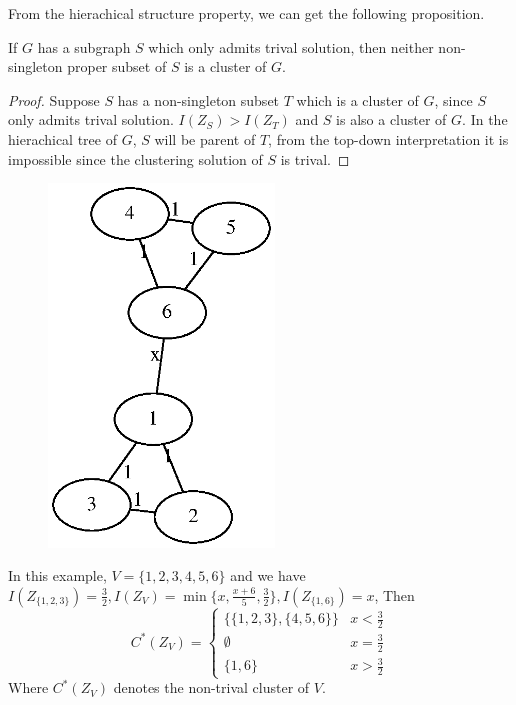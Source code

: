 \documentclass{article}
\begin{document}
From the hierachical structure property, we can get the following proposition.

\begin{proposition}
If $G$ has a subgraph $S$ which only admits trival solution, then neither non-singleton proper subset of $S$ is a cluster of $G$. 
\end{proposition}

\begin{proof}
Suppose  $S$ has a non-singleton subset $T$ which is a cluster of $G$, since $S$ only admits trival solution. $I(Z_S) > I(Z_T)$ and $S$ is also a cluster of $G$. In the hierachical tree of $G$, $S$ will be parent of $T$, from the top-down interpretation it is impossible since the clustering solution of $S$ is trival.
\end{proof}
\begin{example}\label{ex:6point}
\begin{figure}[!ht]
\includegraphics[width=6cm]{pic/6point.eps}
\end{figure}
In this example, $V=\{1,2,3,4,5,6\}$ and we have $I(Z_{\{1,2,3\}})=\frac{3}{2}, I(Z_V) = \min\{x,\frac{x+6}{5}, \frac{3}{2}\}, I(Z_{\{1,6\}})=x$, Then
\begin{equation*}
C^*(Z_V) = 
\begin{cases}
\{\{1,2,3\},\{4,5,6\}\} & x < \frac{3}{2} \\
\emptyset & x = \frac{3}{2} \\
\{1,6\} & x>\frac{3}{2}
\end{cases}
\end{equation*}
Where $C^*(Z_V)$ denotes the non-trival cluster of $V$.
\end{example}
\end{document}
